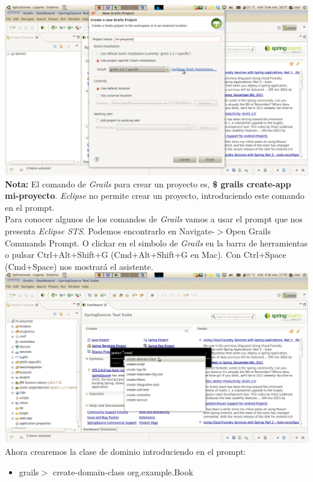 \documentclass[a4paper,12pt,spanish]{article}
\begin{document}
\includegraphics[scale=0.35]{proyecto-specific}\\

{\bf Nota:} El comando de {\it Grails} para crear un proyecto es, {\bf \$ grails create-app mi-proyecto}. {\it Eclipse} no permite crear un proyecto, introduciendo este comando en el prompt.\\

Para conocer algunos de los comandos de {\it Grails} vamos a usar el prompt que nos presenta {\it Eclipse STS}. Podemos encontrarlo en Navigate-$>$Open Grails Commands Prompt. O clickar en el simbolo de {\it Grails} en la barra de herramientas o pulsar Ctrl+Alt+Shift+G (Cmd+Alt+Shift+G en Mac). Con Ctrl+Space (Cmd+Space) nos mostrará el asistente.\\

\includegraphics[scale=0.35]{create-domain}\\
 
Ahora crearemos la clase de dominio introduciendo en el prompt:
\begin{itemize}
\item grails$>$ create-domain-class org.example.Book
\end{itemize}
\end{document}
